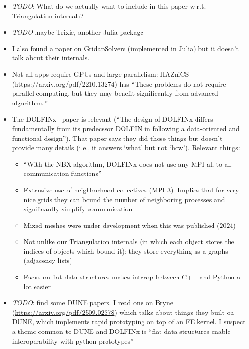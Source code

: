 \documentclass[11pt]{article}
\begin{document}
\begin{itemize}
  \item \emph{TODO}: What do we actually want to include in this paper w.r.t.
    Triangulation internals?

  \item \emph{TODO} maybe Trixie, another Julia package

  \item I also found a paper on GridapSolvers (implemented in Julia) but it
    doesn't talk about their internals.

  \item Not all apps require GPUs and large parallelism: HAZniCS
    (\url{https://arxiv.org/pdf/2210.13274}) has ``These problems do not require
    parallel computing, but they may benefit significantly from advanced
    algorithms.''

  \item The DOLFINx~\cite{DOLFINx} paper is relevant (``The design of DOLFINx
    differs fundamentally from its predecssor DOLFIN in following a
    data-oriented and functional design''). That paper says they did those
    things but doesn't provide many details (i.e., it answers `what' but not
    `how'). Relevant things:
    \begin{itemize}
      \item ``With the NBX algorithm, DOLFINx does not use any MPI all-to-all
        communication functions''

      \item Extensive use of neighborhood collectives (MPI-3). Implies that for
        very nice grids they can bound the number of neighboring processes and
        significantly simplify communication

      \item Mixed meshes were under development when this was published (2024)

      \item Not unlike our Triangulation internals (in which each object stores
        the indices of objects which bound it): they store everything as a
        graphs (adjacency lists)

      \item Focus on flat data structures makes interop between C++ and Python a
        lot easier
    \end{itemize}

  \item \emph{TODO}: find some DUNE papers. I read one on Bryne
    (\url{https://arxiv.org/pdf/2509.02378}) which talks about things they built
    on DUNE, which implements rapid prototyping on top of an FE kernel. I
    suspect a theme common to DUNE and DOLFINx is ``flat data structures enable
    interoperability with python prototypes''


\end{itemize}
\end{document}
